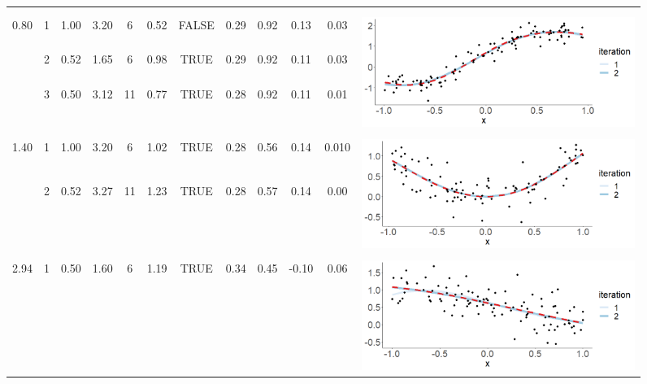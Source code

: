 \begin{figure}
\begin{tabular}{ c c c c c c c c c c | c c}
 \\
 \\[1mm]
\arrayrulecolor{lightgray}\hline \\[-1mm]
\multirow{3}{*}{ 0.80} 
 & 1 & 1.00 & 3.20 & 6 & 0.52 & FALSE & 0.29 & 0.92 & 0.13 & 0.03 & \multirow{5}{*}{ \includegraphics[scale=0.20, trim = 0mm 10mm 0mm 3mm, clip]{fig9_diagnostic_6.png}}\\
 & 2 & 0.52 & 1.65 & 6 & 0.98 & TRUE & 0.29 & 0.92 & 0.11 & 0.03 & \\
 & 3 & 0.50 & 3.12 & 11 & 0.77 & TRUE & 0.28 & 0.92 & 0.11 & 0.01 & \\
 \\
 \\[1mm]
\arrayrulecolor{lightgray}\hline \\[-1mm]
\multirow{2}{*}{ 1.40} 
 & 1 & 1.00 & 3.20 & 6 & 1.02 & TRUE & 0.28 & 0.56 & 0.14 & 0.010 & \multirow{5}{*}{ \includegraphics[scale=0.20, trim = 0mm 10mm 0mm 3mm, clip]{fig9_diagnostic_7.png}}\\
 & 2 & 0.52 & 3.27 & 11 & 1.23 & TRUE & 0.28 & 0.57 & 0.14 & 0.00 & \\
 \\
 \\
 \\[1mm]
 \arrayrulecolor{lightgray}\hline \\[-1mm]
\multirow{2}{*}{ 2.94} 
 & 1 & 0.50 & 1.60 & 6 & 1.19 & TRUE & 0.34 & 0.45 & -0.10 & 0.06 & \multirow{5}{*}{ \includegraphics[scale=0.20, trim = 0mm 10mm 0mm 3mm, clip]{fig9_diagnostic_8.png}}\\

\end{tabular}
\end{figure}
